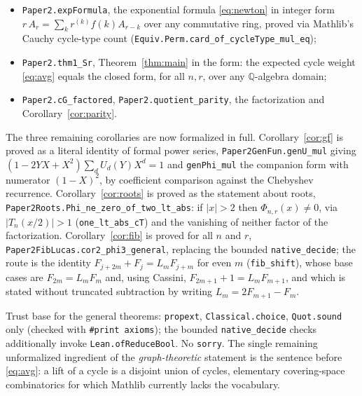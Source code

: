 \documentclass[11pt]{article}
\theoremstyle{remark}
\newcommand{\Q}{\mathbb{Q}}
\begin{document}
\begin{itemize}
\item \texttt{Paper2.expFormula}, the exponential formula
  \eqref{eq:newton} in integer form
  $r\,A_r=\sum_k r^{(k)} f(k)A_{r-k}$ over any commutative ring, proved via
  Mathlib's Cauchy cycle-type count
  (\texttt{Equiv.Perm.\allowbreak card\_of\_\allowbreak cycleType\_mul\_eq});
\item \texttt{Paper2.thm1\_Sr}, Theorem~\ref{thm:main} in the form:
  the expected cycle weight \eqref{eq:avg} equals the closed form, for all
  $n,r$, over any $\Q$-algebra domain;
\item \texttt{Paper2.cG\_factored}, \texttt{Paper2.quotient\_parity}, the factorization and Corollary~\ref{cor:parity}.
\end{itemize}

The three remaining corollaries are now formalized in full.
Corollary~\ref{cor:gf} is proved as a literal identity of formal power series,
\texttt{Paper2GenFun.genU\_mul} giving
$(1-2YX+X^2)\sum_dU_d(Y)X^d=1$ and \texttt{genPhi\_mul} the companion form with numerator
$(1-X)^2$, by coefficient comparison against the Chebyshev recurrence.
Corollary~\ref{cor:roots} is proved as the statement about roots,
\texttt{Paper2Roots.Phi\_ne\_zero\_of\_two\_lt\_abs}: if $|x|>2$ then
$\Phi_{n,r}(x)\neq0$, via $|T_n(x/2)|>1$ (\texttt{one\_lt\_abs\_cT}) and the vanishing of
neither factor of the factorization.
Corollary~\ref{cor:fib} is proved for all $n$ and $r$,
\texttt{Paper2FibLucas.cor2\_phi3\_general}, replacing the bounded
\texttt{native\_decide}; the route is the identity $F_{j+2m}+F_j=L_mF_{j+m}$ for even $m$
(\texttt{fib\_shift}), whose base cases are $F_{2m}=L_mF_m$ and, using Cassini,
$F_{2m+1}+1=L_mF_{m+1}$, and which is stated without truncated subtraction by writing
$L_m=2F_{m+1}-F_m$.

Trust base for the general theorems: \texttt{propext}, \texttt{Classical.choice},
\texttt{Quot.sound} only (checked with \texttt{\#print axioms}); the bounded
\texttt{native\_decide} checks additionally invoke \texttt{Lean.ofReduceBool}.
No \texttt{sorry}. The single remaining unformalized ingredient of the
\emph{graph-theoretic} statement is the sentence before \eqref{eq:avg}: a lift
of a cycle is a disjoint union of cycles, elementary covering-space
combinatorics for which Mathlib currently lacks the vocabulary.
\end{document}
